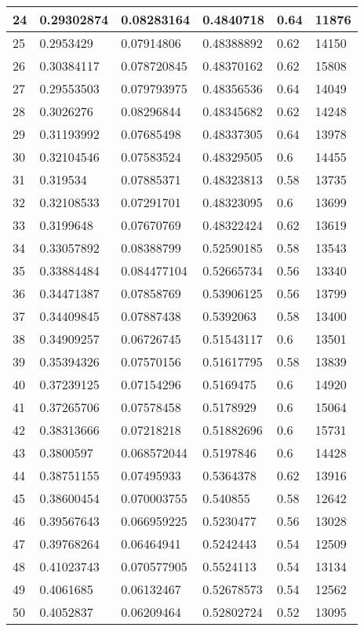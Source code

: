 \begin{longtable}{|l|l|l|l|l|l|}
24 & 0.29302874 & 0.08283164 & 0.4840718 & 0.64 & 11876 \\ \hline 
25 & 0.2953429 & 0.07914806 & 0.48388892 & 0.62 & 14150 \\ \hline 
26 & 0.30384117 & 0.078720845 & 0.48370162 & 0.62 & 15808 \\ \hline 
27 & 0.29553503 & 0.079793975 & 0.48356536 & 0.64 & 14049 \\ \hline 
28 & 0.3026276 & 0.08296844 & 0.48345682 & 0.62 & 14248 \\ \hline 
29 & 0.31193992 & 0.07685498 & 0.48337305 & 0.64 & 13978 \\ \hline 
30 & 0.32104546 & 0.07583524 & 0.48329505 & 0.6 & 14455 \\ \hline 
31 & 0.319534 & 0.07885371 & 0.48323813 & 0.58 & 13735 \\ \hline 
32 & 0.32108533 & 0.07291701 & 0.48323095 & 0.6 & 13699 \\ \hline 
33 & 0.3199648 & 0.07670769 & 0.48322424 & 0.62 & 13619 \\ \hline 
34 & 0.33057892 & 0.08388799 & 0.52590185 & 0.58 & 13543 \\ \hline 
35 & 0.33884484 & 0.084477104 & 0.52665734 & 0.56 & 13340 \\ \hline 
36 & 0.34471387 & 0.07858769 & 0.53906125 & 0.56 & 13799 \\ \hline 
37 & 0.34409845 & 0.07887438 & 0.5392063 & 0.58 & 13400 \\ \hline 
38 & 0.34909257 & 0.06726745 & 0.51543117 & 0.6 & 13501 \\ \hline 
39 & 0.35394326 & 0.07570156 & 0.51617795 & 0.58 & 13839 \\ \hline 
40 & 0.37239125 & 0.07154296 & 0.5169475 & 0.6 & 14920 \\ \hline 
41 & 0.37265706 & 0.07578458 & 0.5178929 & 0.6 & 15064 \\ \hline 
42 & 0.38313666 & 0.07218218 & 0.51882696 & 0.6 & 15731 \\ \hline 
43 & 0.3800597 & 0.068572044 & 0.5197846 & 0.6 & 14428 \\ \hline 
44 & 0.38751155 & 0.07495933 & 0.5364378 & 0.62 & 13916 \\ \hline 
45 & 0.38600454 & 0.070003755 & 0.540855 & 0.58 & 12642 \\ \hline 
46 & 0.39567643 & 0.066959225 & 0.5230477 & 0.56 & 13028 \\ \hline 
47 & 0.39768264 & 0.06464941 & 0.5242443 & 0.54 & 12509 \\ \hline 
48 & 0.41023743 & 0.070577905 & 0.5524113 & 0.54 & 13134 \\ \hline 
49 & 0.4061685 & 0.06132467 & 0.52678573 & 0.54 & 12562 \\ \hline 
50 & 0.4052837 & 0.06209464 & 0.52802724 & 0.52 & 13095 \\ \hline 
\end{longtable}